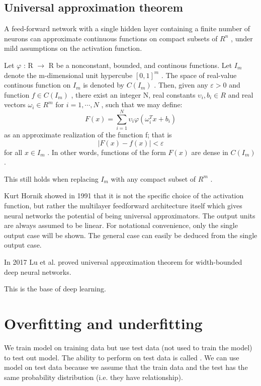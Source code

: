 \subsection{Universal approximation theorem}
\label{sec:univ-appr-theor}

A feed-forward network with a single hidden layer containing a finite number of neurons can
approximate continuous functions on compact subsets of $R^n$ , under mild assumptions on the activation function. 

Let $\varphi$ : R $\rightarrow$ R be a nonconstant, bounded, and continous functions.
Let $I_m$ denote the m-dimensional unit hypercube $[0,1]^m$ .
The space of real-value continous function on $I_m$ is denoted by $C(I_m)$ .
Then, given any $\varepsilon > 0$ and function $f \in C(I_m)$ ,
there exist an integer N, real constants $\upsilon_i, b_i \in R$ and real vectors $\omega_i \in R^m$ for $i = 1, \cdots, N$ , such that we may define:
\begin{equation}
F(x) = \sum_{i=1}^{N}\upsilon_i\varphi(\omega_i^Tx+b_i)
\end{equation}
as an approximate realization of the function f; that is
\begin{equation}
|F(x) - f(x)| < \varepsilon
\end{equation}
for all $x \in I_m$ .
In other words, functions of the form $F(x)$ are dense in $C(I_m)$ .

This still holds when replacing $I_m$ with any compact subset of $R^m$ .



Kurt Hornik showed in 1991 that it is not the specific choice of the activation function, but rather the multilayer feedforward architecture itself which gives neural networks the potential of being universal approximators. The output units are always assumed to be linear. For notational convenience, only the single output case will be shown. The general case can easily be deduced from the single output case.

In 2017 Lu et al. proved universal approximation theorem for width-bounded deep neural networks.

This is the base of deep learning.

\section{Overfitting and underfitting}


We train model on training data but use test data (not used to train the model) to test out model.
The ability to perform on test data is called .
We can use model on test data because we assume that the train data and the test has the same probability distribution (i.e. they have relationship).

